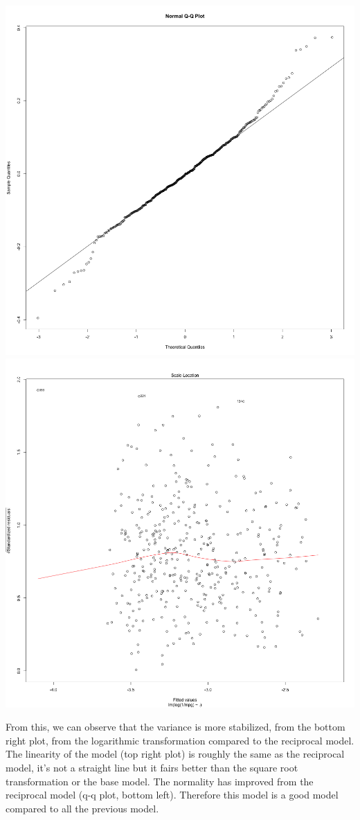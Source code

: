 \documentclass[11pt]{article} %
\begin{document}
\begin{center}
\includegraphics[scale=0.13]{5_QQplot}
\includegraphics[scale=0.13]{5_Variance}
\end{center}
From this, we can observe that the variance is more stabilized, from the bottom right plot, from the logarithmic transformation compared to the reciprocal model. The linearity of the model (top right plot) is roughly the same as the reciprocal model, it's not a straight line but it fairs better than the square root transformation or the base model. The normality has improved from the reciprocal model (q-q plot, bottom left). Therefore this model is a good model compared to all the previous model.
\end{document}
